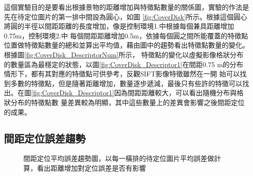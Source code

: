 	這個實驗目的是要看出根據景物的距離增加與特徵點數量的關係圖，實驗的作法是先在待定位圖片的第一排中間設為圓心，如圖
\ref{fig:CoverDisk}所示。根據這個圓心將圓的半徑以間距距離的長度增加，像是控制環境1.中根據每個兼具距離增加0.75m，控制環境2.中                                                                               
每個間距距離增加0.5m，依據每個圓之間所能覆蓋的特徵點位置做特徵點數量的總和並算出平均值，藉由圖中的趨勢看出特徵點數量的變化。根據圖\ref{fig:CoverDisk_DescriptorNum}所示，
特徵點的變化以虛擬影像格狀分布的數量區為最穩定的狀態，以圖\ref{fig:CoverDisk_Descriptor1}在間距0.75 m的分布情形下，都有其對應的特徵點可供參考，反觀SIFT影像特徵雖然在一開
始可以找到多數的特徵點，但是隨著距離增加，數量逐步遞減，最後只有些許的特徵可以找出。在圖\ref{fig:CoverDisk_Descriptor1}因為間距距離較大，可以看出隨機分布與格狀分布的特徵點數
量差異較為明顯，其中這些數量上的差異會影響之後間距定位的成果。
	
\subsection{間距定位誤差趨勢}	
	
\begin{figure}
	\begin{center}
	\end{center}
  \caption{間距定位平均誤差趨勢圖，以每一橫排的待定位圖片平均誤差做計算，看出距離增加對定位誤差是否有影響}
  \label{fig:Localization_Distance_Error}	
\end{figure}	
	
